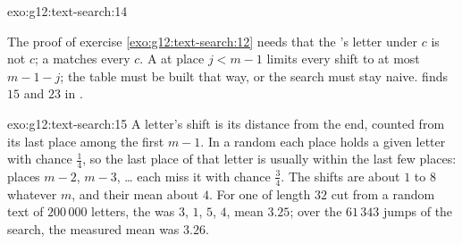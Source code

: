 \begin{solution}{exo:g12:text-search:14}
\smallskip\noindent\hspace*{2em}

\noindent\hspace*{4em}

\noindent\hspace*{4em}

\noindent\hspace*{4em}

\noindent\hspace*{6em}

\noindent\hspace*{8em}

\noindent\hspace*{4em}

\smallskip\noindent The proof of exercise \ref{exo:g12:text-search:12} needs that the 's letter under $c$ is
not $c$; a  matches every $c$. A  at place $j < m - 1$ limits every shift to at most $m - 1 - j$; the
table must be built that way, or the search must stay naive.  finds $15$ and $23$ in
.
\end{solution}

\begin{solution}{exo:g12:text-search:15}
A letter's shift is its distance from the end, counted from its last place among the first $m - 1$. In a random
 each place holds a given letter with chance $\frac14$, so the last place of that letter is usually within
the last few places: places $m - 2$, $m - 3$, \dots{} each miss it with chance $\frac34$. The shifts are about $1$
to $8$ whatever $m$, and their mean about $4$. For one  of length $32$ cut from a random text of $200\,000$
letters, the  was  $3$,  $1$,  $5$,  $4$, mean $3.25$; over the $61\,343$
jumps of the search, the measured mean was $3.26$.
\end{solution}

